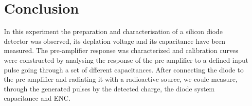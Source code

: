 \documentclass[12pt]{article}
\begin{document}
\section{Conclusion}

In this experiment the preparation and characterisation of a silicon diode detector was observed, its deplation voltage and its capacitance have been measured. The pre-amplifier response was characterized and calibration curves were constructed by analysing the response of the pre-amplifier to a defined input pulse going through a set of dfferent capacitances. After connecting the diode to the pre-amplifier and radiating it with a radioactive source, we coule measure, through the generated pulses by the detected charge, the diode system capacitance and ENC.
\end{document}
